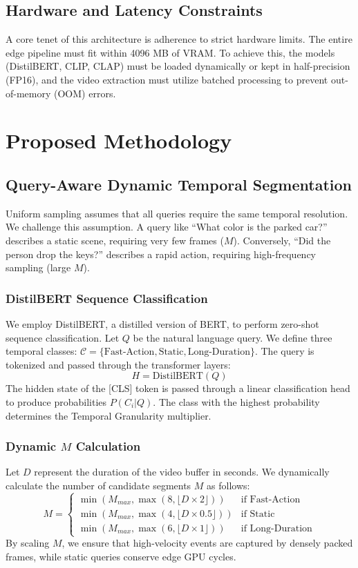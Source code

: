 \documentclass[12pt, a4paper]{report}
\begin{document}
\section{Hardware and Latency Constraints}
A core tenet of this architecture is adherence to strict hardware limits. The entire edge pipeline must fit within 4096 MB of VRAM. To achieve this, the models (DistilBERT, CLIP, CLAP) must be loaded dynamically or kept in half-precision (FP16), and the video extraction must utilize batched processing to prevent out-of-memory (OOM) errors.

\chapter{Proposed Methodology}

\section{Query-Aware Dynamic Temporal Segmentation}
Uniform sampling assumes that all queries require the same temporal resolution. We challenge this assumption. A query like ``What color is the parked car?'' describes a static scene, requiring very few frames ($M$). Conversely, ``Did the person drop the keys?'' describes a rapid action, requiring high-frequency sampling (large $M$).

\subsection{DistilBERT Sequence Classification}
We employ DistilBERT, a distilled version of BERT, to perform zero-shot sequence classification. Let $Q$ be the natural language query. We define three temporal classes: $\mathcal{C} = \{\text{Fast-Action}, \text{Static}, \text{Long-Duration}\}$. The query is tokenized and passed through the transformer layers:
\begin{equation}
H = \text{DistilBERT}(Q)
\end{equation}
The hidden state of the [CLS] token is passed through a linear classification head to produce probabilities $P(C_i | Q)$. The class with the highest probability determines the Temporal Granularity multiplier.

\subsection{Dynamic $M$ Calculation}
Let $D$ represent the duration of the video buffer in seconds. We dynamically calculate the number of candidate segments $M$ as follows:
\begin{equation}
M = 
\begin{cases} 
\min(M_{max}, \max(8, \lfloor D \times 2 \rfloor)) & \text{if Fast-Action} \\
\min(M_{max}, \max(4, \lfloor D \times 0.5 \rfloor)) & \text{if Static} \\
\min(M_{max}, \max(6, \lfloor D \times 1 \rfloor)) & \text{if Long-Duration}
\end{cases}
\end{equation}
By scaling $M$, we ensure that high-velocity events are captured by densely packed frames, while static queries conserve edge GPU cycles.
\end{document}
